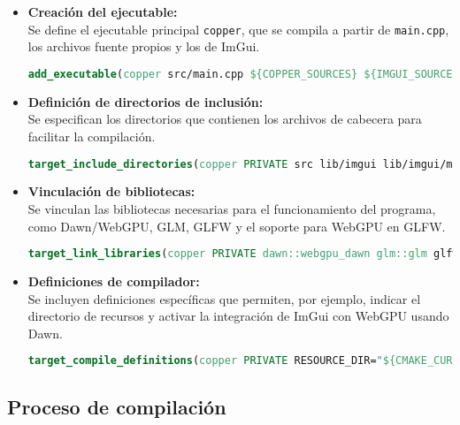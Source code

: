 \begin{itemize}
    \item \textbf{Creación del ejecutable:}\\
          Se define el ejecutable principal \texttt{copper}, que se compila a partir de \texttt{main.cpp}, los archivos fuente propios y los de ImGui.
          \begin{lstlisting}[language=CMake, caption={Creación del ejecutable en CMakeLists.txt}]
    add_executable(copper src/main.cpp ${COPPER_SOURCES} ${IMGUI_SOURCES})
    \end{lstlisting}

    \item \textbf{Definición de directorios de inclusión:}\\
          Se especifican los directorios que contienen los archivos de cabecera para facilitar la compilación.
          \begin{lstlisting}[language=CMake, caption={Definición de directorios de inclusión en CMakeLists.txt}]
    target_include_directories(copper PRIVATE src lib/imgui lib/imgui/misc/cpp lib/imgui/backends ${CMAKE_CURRENT_BINARY_DIR}/src)
    \end{lstlisting}

    \item \textbf{Vinculación de bibliotecas:}\\
          Se vinculan las bibliotecas necesarias para el funcionamiento del programa, como Dawn/WebGPU, GLM, GLFW y el soporte para WebGPU en GLFW.
          \begin{lstlisting}[language=CMake, caption={Vinculación de bibliotecas en CMakeLists.txt}]
    target_link_libraries(copper PRIVATE dawn::webgpu_dawn glm::glm glfw webgpu_glfw ImGuiFileDialog)
    \end{lstlisting}

    \item \textbf{Definiciones de compilador:}\\
          Se incluyen definiciones específicas que permiten, por ejemplo, indicar el directorio de recursos y activar la integración de ImGui con WebGPU usando Dawn.
          \begin{lstlisting}[language=CMake, caption={Definiciones de compilador en CMakeLists.txt}]
    target_compile_definitions(copper PRIVATE RESOURCE_DIR="${CMAKE_CURRENT_SOURCE_DIR}/src" IMGUI_IMPL_WEBGPU_BACKEND_DAWN)
    \end{lstlisting}
\end{itemize}

\subsection{Proceso de compilación}

